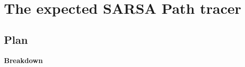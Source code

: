 \documentclass[ %
                    author={Callum Pearce},
                supervisor={Dr. Neill Campbell},
                    degree={MEng},
                     title={How effective are Temporal difference learning methods for reducing the number of zero contribution light paths while still accurately approximating Global Illumination in Path tracing?},
                  subtitle={},
                      type={research},
                      year={2019} ]{dissertation}
\begin{document}
\section{The expected SARSA Path tracer}

\subsection{Plan}
\textbf{Breakdown}
\end{document}
